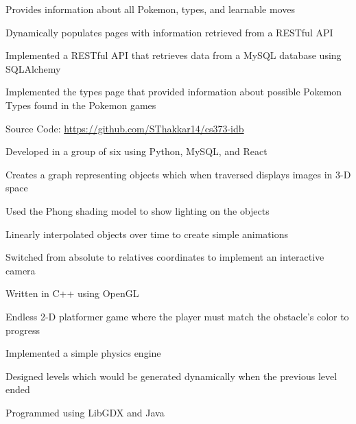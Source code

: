 \documentclass[]{deedy-resume-openfont}
\begin{document}
\begin{minipage}[t]{0.66\textwidth}
\begin{tightemize}
\item Provides information about all Pokemon, types, and learnable moves
\item Dynamically populates pages with information retrieved from a RESTful API
\item Implemented a RESTful API that retrieves data from a MySQL database using SQLAlchemy
\item Implemented the types page that provided information about possible Pokemon Types found in the Pokemon games
\item Source Code: \href{https://github.com/SThakkar14/cs373-idb}{https://github.com/SThakkar14/cs373-idb}
\item Developed in a group of six using Python, MySQL, and React
\end{tightemize}
\sectionsep

\begin{tightemize}
\item Creates a graph representing objects which when traversed displays images in 3-D space
\item Used the Phong shading model to show lighting on the objects
\item Linearly interpolated objects over time to create simple animations
\item Switched from absolute to relatives coordinates to implement an interactive camera
\item Written in C++ using OpenGL
\end{tightemize}
\sectionsep

\begin{tightemize}
\item Endless 2-D platformer game where the player must match the obstacle's color to progress
\item Implemented a simple physics engine
\item Designed levels which would be generated dynamically when the previous level ended
\item Programmed using LibGDX and Java
\end{tightemize}
\sectionsep

\end{minipage} 
\end{document}
